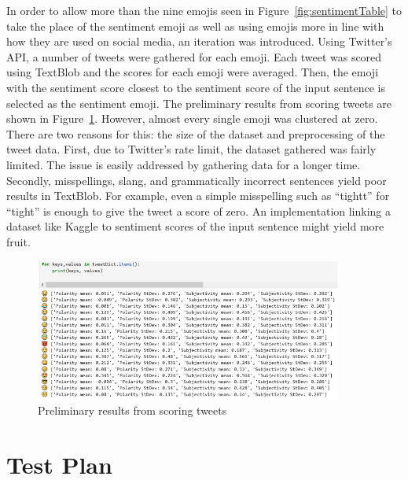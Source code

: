 \documentclass{article}[10]
\begin{document}
In order to allow more than the nine emojis seen in
Figure~{\ref{fig:sentimentTable}} to take the place of the
sentiment emoji as well as using emojis more in line with how they are
used on social media, an iteration was introduced. Using Twitter's
API, a number of tweets were gathered for each emoji. Each tweet was
scored using TextBlob and the scores for each emoji were averaged. Then,
the emoji with the sentiment score closest to the sentiment score of the
input sentence is selected as the sentiment emoji. The preliminary
results from scoring tweets are shown in Figure~\ref{fig:tweetScoring}. However, almost every
single emoji was clustered at zero. There are two reasons for this: the
size of the dataset and preprocessing of the tweet data. First, due to
Twitter's rate limit, the dataset gathered was fairly limited. The
issue is easily addressed by gathering data for a longer time. Secondly,
misspellings, slang, and grammatically incorrect sentences yield poor
results in TextBlob. For example, even a simple misspelling such as
``tightt'' for ``tight'' is enough to give the tweet a score of
zero. An implementation linking a dataset like Kaggle to sentiment
scores of the input sentence might yield more fruit.

\begin{figure}[h]
  \begin{center}
    \includegraphics[width=0.90\textwidth]{figures/sentiment_results.png}
    \caption{Preliminary results from scoring tweets\label{fig:tweetScoring}}
  \end{center}
\end{figure}


\section{Test Plan\label{sec:testPlan}}
\end{document}
